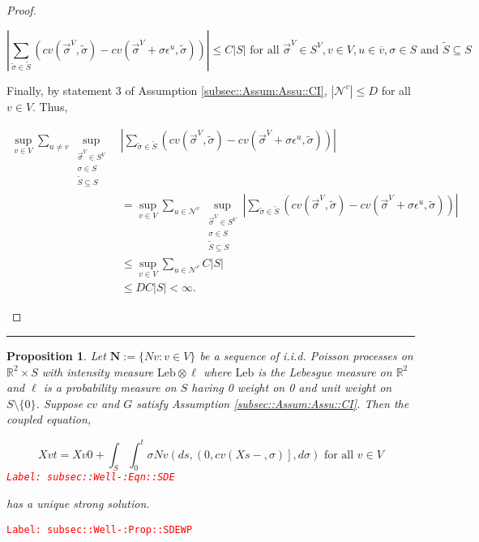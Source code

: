 \documentclass[12pt]{article}
\newcommand{\mb}{\mathbb}
\newcommand{\mc}{\mathcal}
\newcommand{\ov}{\overline}
\newcommand{\te}{\text}
\newcommand{\ep}{\epsilon}
\newcommand{\tr}{\textcolor{red}}
\newcommand{\labe}[1]{\tr{\texttt{Label: #1}}}
\newcommand{\lin}{\rule{\linewidth}{0.4 pt}}
\newcommand{\defeq}{:=}								%
\renewcommand{\v}{v}							%
\newcommand{\vv}{u}								%
\renewcommand{\S}{S}							%
\newcommand{\s}{\sigma}							%
\newcommand{\sv}{\vec{\s}}						%
\newcommand{\ev}{\ep}							%
\renewcommand{\t}{t}							%
\renewcommand{\tt}{s}							%
\newcommand{\X}{X}								%
\newcommand{\IGr}{c}							%
\newcommand{\neigh}{\mc{N}}						%
\newcommand{\vind}[1]{^{#1}}					%
\newcommand{\carp}[1]{^{#1}}					%
\newcommand{\vsi}[1]{^{#1}}						%
\newcommand{\cind}[1]{_{#1}}					%
\newcommand{\cl}{\ov}							%
\newcommand{\const}{C}							%
\newcommand{\degr}{D}							%
\renewcommand{\ss}{\tilde{\s}}					%
\renewcommand{\SS}{\tilde{\S}}					%
\newcommand{\poisses}{\mathbf{N}}				%
\newcommand{\poiss}{N}							%
\newcommand{\leb}{\te{Leb}}						%
\newcommand{\Sm}{\ell}							%
\newtheorem{prop}[thms]{Proposition}
\begin{document}
\begin{proof}
\begin{enumerate}[i)]
\[\left|\sum_{\ss \in \SS} (\IGr{\v}(\sv\cind{}\vsi{V},\ss) - \IGr{\v}(\sv\cind{}\vsi{V}+\s\ev\vind{\vv},\ss))\right| \leq \const{}|\S| \te{ for all } \sv\cind{}\vsi{V} \in \S\carp{V},\v \in V, \vv \in \cl{\v}, \s \in \S \te{ and } \SS\subseteq \S\]

Finally, by statement 3 of Assumption \ref{subsec::Assum:Assu::CI}, \(|\neigh\vind{\v}| \leq \degr\) for all \(\v \in V\). Thus,

\begin{align*}
\sup_{\v\in V}\sum_{\vv \neq \v} \sup_{\substack{\sv\cind{}\vsi{V} \in \S\carp{V}\\ \s\in \S\\ \SS\subseteq \S}}& \left|\sum_{\ss \in \SS} (\IGr{\v}(\sv\cind{}\vsi{V},\ss) - \IGr{\v}(\sv\cind{}\vsi{V}+\s\ev\vind{\vv},\ss))\right|\\
&  = \sup_{\v\in V}\sum_{\vv\in \neigh\vind{\v}} \sup_{\substack{\sv\cind{}\vsi{V} \in \S\carp{V}\\ \s\in \S\\ \SS\subseteq \S}} \left|\sum_{\ss \in \SS} (\IGr{\v}(\sv\cind{}\vsi{V},\ss) - \IGr{\v}(\sv\cind{}\vsi{V}+\s\ev\vind{\vv},\ss))\right|\\
&\leq \sup_{\v\in V} \sum_{\vv \in \neigh\vind{\v}} \const{}|\S|\\
&\leq \degr \const{}|\S| < \infty.
\end{align*}


\end{enumerate}
\end{proof}

\lin

\begin{prop}
Let \(\poisses \defeq \{\poiss{\v}:\v\in V\}\) be a sequence of i.i.d. Poisson processes on \(\mb{R}^2\times \S\) with intensity measure \(\leb\otimes \Sm\) where \(\leb\) is the Lebesgue measure on \(\mb{R}^2\) and \(\Sm\) is a probability measure on \(\S\) having 0 weight on 0 and unit weight on \(\S\setminus \{0\}\). Suppose \(\IGr{\v}\) and \(G\) satisfy Assumption \ref{subsec::Assum:Assu::CI}. Then the coupled equation,

\begin{equation}
\X{\v}{\t} = \X{\v}{0} + \int_\S\int_0^\t \s\poiss{\v}\left(d\tt,\left(0,\IGr{\v}(\X{}{\tt-},\s)\right],d\s\right) \te{ for all }\v \in V
\label{subsec::Well-:Eqn::SDE}
\end{equation}
\labe{subsec::Well-:Eqn::SDE}

has a unique strong solution.
\label{subsec::Well-:Prop::SDEWP}
\end{prop}
\labe{subsec::Well-:Prop::SDEWP}
\end{document}
